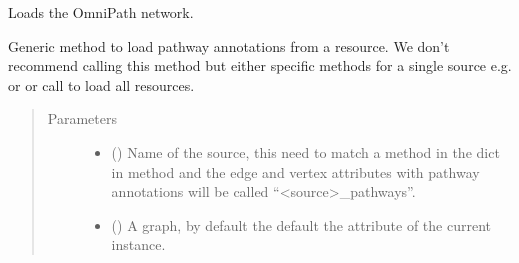 \documentclass[letterpaper,10pt,english]{sphinxmanual}
\begin{document}
\begin{fulllineitems}
\begin{fulllineitems}
\end{fulllineitems}


\begin{fulllineitems}
\label{\detokenize{main:pypath.main.PyPath.load_omnipath}}
Loads the OmniPath network.

\end{fulllineitems}


\begin{fulllineitems}
\label{\detokenize{main:pypath.main.PyPath.load_pathways}}
Generic method to load pathway annotations from a resource.
We don’t recommend calling this method but either specific
methods for a single source e.g. 
or  or call  to
load all resources.
\begin{quote}\begin{description}
\item[{Parameters}] \leavevmode\begin{itemize}
\item {} 
 () \textendash{} Name of the source, this need to match a method in the dict
in  method and the edge and vertex attributes
with pathway annotations will be called “\textless{}source\textgreater{}\_pathways”.

\item {} 
 () \textendash{} A graph, by default the default the  attribute of the
current instance.

\end{itemize}

\end{description}\end{quote}


\end{fulllineitems}
\end{fulllineitems}
\end{document}
